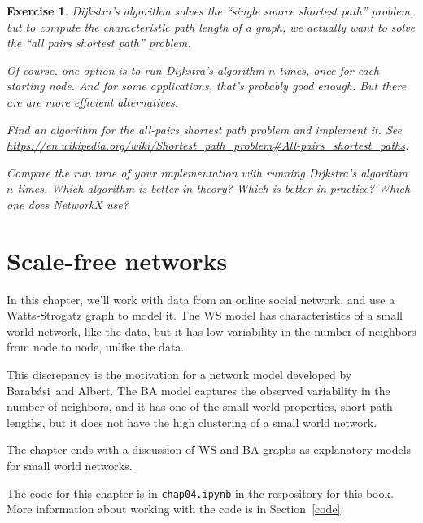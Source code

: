 \documentclass[12pt]{book}
\theoremstyle{exercise}
\newtheorem{exercise}{Exercise}[chapter]
\begin{document}
\begin{exercise}

Dijkstra's algorithm solves the ``single source shortest path''
problem, but to compute the characteristic path length of a graph,
we actually want to solve the ``all pairs shortest path'' problem.

Of course, one option is to run Dijkstra's algorithm $n$ times,
once for each starting node.  And for some applications, that's
probably good enough.  But there are are more efficient alternatives.

Find an algorithm for the all-pairs shortest path problem and
implement it.  See
\url{https://en.wikipedia.org/wiki/Shortest_path_problem#All-pairs_shortest_paths}.

Compare the run time of your implementation with running
Dijkstra's algorithm $n$ times.  Which algorithm is better in
theory?  Which is better in practice?  Which one does NetworkX
use?


\end{exercise}



\chapter{Scale-free networks}
\label{scale-free}

\newcommand{\Barabasi}{Barab\'{a}si}

In this chapter, we'll work with data from an online social network, and use a
Watts-Strogatz graph to model it.  The WS model has characteristics of
a small world network, like the data, but it has low
variability in the number of neighbors from node to node,
unlike the data.

This discrepancy is the motivation for a network model developed
by \Barabasi~and Albert.  The BA model captures the observed variability
in the number of neighbors, and it has one of the small world
properties, short path lengths, but it does not have the high
clustering of a small world network.

The chapter ends with a discussion of WS and BA graphs as explanatory
models for small world networks.

The code for this chapter is in {\tt chap04.ipynb} in the respository
for this book.  More information about working with the code is
in Section~\ref{code}.
\end{document}
